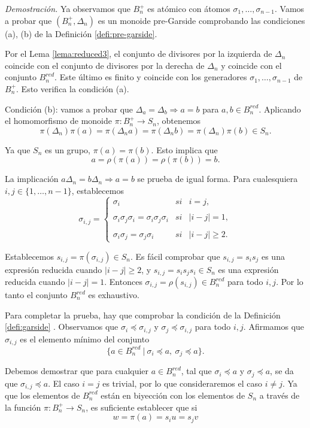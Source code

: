 \documentclass[12pt]{article}
\theoremstyle{definition}
\begin{document}
\textit{Demostración.} Ya observamos que $B_n^+$ es atómico con átomos $\sigma_1,\ldots,\sigma_{n-1}$. Vamos a probar que $(B_n^+,\Delta_n)$ es un monoide pre-Garside comprobando las condiciones (a), (b) de la Definición \ref{defi:pre-garside}.

Por el Lema \ref{lema:reduced3}, el conjunto de divisores por la izquierda de $\Delta_n$ coincide con el conjunto de divisores por la derecha de $\Delta_n$ y coincide con el conjunto $B_n^{red}$. Este último es finito y coincide con los generadores $\sigma_1,\ldots,\sigma_{n-1}$ de $B_n^+$. Esto verifica la condición (a).

Condición (b): vamos a probar que $\Delta_a=\Delta_b\Rightarrow a=b$ para $a,b\in B_n^{red}.$ Aplicando el homomorfismo de monoide $\pi: B_n^+\rightarrow S_n$, obtenemos
$$\pi(\Delta_n)\pi(a)=\pi(\Delta_n a)=\pi(\Delta_n b)=\pi(\Delta_n)\pi(b)\in S_n.$$

Ya que $S_n$ es un grupo, $\pi(a)=\pi(b)$. Esto implica que
$$a=\rho(\pi(a))=\rho(\pi(b))=b.$$

La implicación $a\Delta_n=b\Delta_n\Rightarrow a=b$ se prueba de igual forma.
Para cualesquiera $i,j\in\{1,\ldots,n-1\}$, establecemos
$$\sigma_{i,j}= \left\{ \begin{array}{lcc}
             \sigma_i &   si  & i=j, \\
             \\ \sigma_i\sigma_j\sigma_i=\sigma_i\sigma_j\sigma_i &  si & |i-j|=1, \\
             \\ \sigma_i\sigma_j=\sigma_j\sigma_i &  si  & |i-j|\geq 2.
             \end{array}
   \right.$$
   
Establecemos $s_{i,j}=\pi(\sigma_{i,j})\in S_n$. Es fácil comprobar que $s_{i,j}=s_is_j$ es una expresión reducida cuando $|i-j|\geq 2$, y $s_{i,j}=s_is_js_i\in S_n$ es una expresión reducida cuando $|i-j|=1$. Entonces $\sigma_{i,j}=\rho(s_{i,j})\in B_n^{red}$ para todo $i,j$. Por lo tanto el conjunto $B_n^{red}$ es exhaustivo.

Para completar la prueba, hay que comprobar la condición de la Definición \ref{defi:garside}
. Observamos que $\sigma_i\preceq \sigma_{i,j}$ y $\sigma_j\preceq\sigma_{i,j}$ para todo $i,j$. Afirmamos que $\sigma_{i,j}$ es el elemento mínimo del conjunto
$$\{a\in B_n^{red}\ |\ \sigma_i\preceq a,\ \sigma_j\preceq a\}.$$

Debemos demostrar que para cualquier $a\in B_n^{red}$, tal que $\sigma_i\preceq a$ y $\sigma_j\preceq a$, se da que $\sigma_{i,j}\preceq a$. El caso $i=j$ es trivial, por lo que consideraremos el caso $i\neq j$. Ya que los elementos de $B_n^{red}$ están en biyección con los elementos de $S_n$ a través de la función $\pi: B_n^+\rightarrow S_n$, es suficiente establecer que si
$$w=\pi(a)=s_iu=s_jv$$
\end{document}
